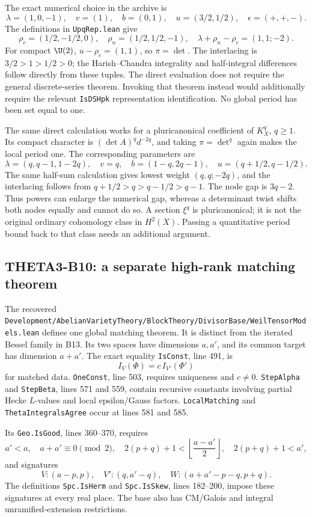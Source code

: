 The exact numerical choice in the archive is
\[
 \lambda=(1,0,-1),\quad v=(1),\quad b=(0,1),\quad
 u=(3/2,1/2),\quad\epsilon=(+,+,-).
\]
The definitions in \texttt{UpqRep.lean} give
\[
 \rho_c=(1/2,-1/2,0),\quad\rho_n=(1/2,1/2,-1),\quad
 \lambda+\rho_n-\rho_c=(1,1;-2).
\]
For compact $\U(2)$, $u-\rho_c=(1,1)$, so $\pi=\det$. The interlacing is
$3/2>1>1/2>0$; the Harish--Chandra integrality and half-integral differences follow directly from these tuples. The direct evaluation does not require the general discrete-series theorem. Invoking that theorem instead would additionally require the relevant \texttt{IsDSHpk} representation identification. No global period has been set equal to one.

The same direct calculation works for a pluricanonical coefficient of $K_X^q$, $q\geq1$. Its compact character is $(\det A)^qd^{-2q}$, and taking $\pi=\det^q$ again makes the local period one. The corresponding parameters are
\[
 \lambda=(q,q-1,1-2q),\quad v=q,\quad
 b=(1-q,2q-1),\quad u=(q+1/2,q-1/2).
\]
The same half-sum calculation gives lowest weight $(q,q;-2q)$, and the interlacing follows from
$q+1/2>q>q-1/2>q-1$. The node gap is $3q-2$. Thus powers can enlarge the numerical gap, whereas a determinant twist shifts both nodes equally and cannot do so. A section $\xi^q$ is pluricanonical; it is not the original ordinary cohomology class in $H^2(X)$. Passing a quantitative period bound back to that class needs an additional argument.

\subsection{THETA3-B10: a separate high-rank matching theorem}\label{B10}

The recovered \texttt{Development/\allowbreak{}AbelianVarietyTheory/\allowbreak{}BlockTheory/\allowbreak{}DivisorBase/\allowbreak{}WeilTensorModels.lean} defines one global matching theorem. It is distinct from the iterated Bessel family in B13. Its two spaces have dimensions $a,a'$, and its common target has dimension $a+a'$. The exact equality \texttt{IsConst}, line 491, is
\[
 I_V(\Phi)=c\,I_{V'}(\Phi')
\]
for matched data. \texttt{OneConst}, line 503, requires uniqueness and $c\ne0$. \texttt{StepAlpha} and \texttt{StepBeta}, lines 571 and 559, contain recursive constants involving partial Hecke $L$-values and local epsilon/Gauss factors. \texttt{LocalMatching} and \texttt{ThetaIntegralsAgree} occur at lines 581 and 585.

Its \texttt{Geo.IsGood}, lines 360--370, requires
\[
 a'<a,\quad a+a'\equiv0\pmod2,\quad
 2(p+q)+1<\left\lfloor\frac{a-a'}2\right\rfloor,\quad
 2(p+q)+1<a',
\]
and signatures
\[
 V:(a-p,p),\quad V':(q,a'-q),\quad
 W:(a+a'-p-q,p+q).
\]
The definitions \texttt{Spc.IsHerm} and \texttt{Spc.IsSkew}, lines 182--200, impose these signatures at every real place. The base also has CM/Galois and integral unramified-extension restrictions.

